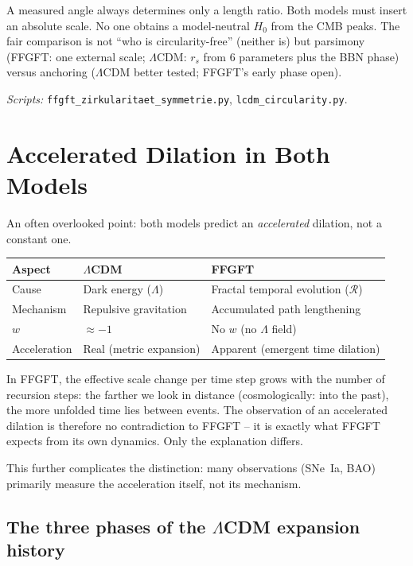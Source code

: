 A measured angle always determines only a length ratio. Both models must
insert an absolute scale. No one obtains a model-neutral $H_0$ from the CMB
peaks. The fair comparison is not ``who is circularity-free'' (neither is)
but parsimony (FFGFT: one external scale; $\Lambda$CDM: $r_s$ from 6
parameters plus the BBN phase) versus anchoring ($\Lambda$CDM better tested;
FFGFT's early phase open).

\emph{Scripts:} \texttt{ffgft\_zirkularitaet\_symmetrie.py},
\texttt{lcdm\_circularity.py}.

\section{Accelerated Dilation in Both Models}

An often overlooked point: both models predict an \emph{accelerated}
dilation, not a constant one.

\begin{center}
\begin{tabular}{p{3cm}p{5cm}p{5cm}}
\toprule
\textbf{Aspect} & \textbf{$\Lambda$CDM} & \textbf{FFGFT} \\
\midrule
Cause & Dark energy ($\Lambda$) & Fractal temporal evolution ($\mathcal{R}$) \\
Mechanism & Repulsive gravitation & Accumulated path lengthening \\
$w$ & $\approx -1$ & No $w$ (no $\Lambda$ field) \\
Acceleration & Real (metric expansion) & Apparent (emergent time dilation) \\
\bottomrule
\end{tabular}
\end{center}

In FFGFT, the effective scale change per time step grows with the number of
recursion steps: the farther we look in distance (cosmologically: into the
past), the more unfolded time lies between events. The observation of an
accelerated dilation is therefore no contradiction to FFGFT -- it is exactly
what FFGFT expects from its own dynamics. Only the explanation differs.

This further complicates the distinction: many observations (SNe~Ia, BAO)
primarily measure the acceleration itself, not its mechanism.

\subsection*{The three phases of the $\Lambda$CDM expansion history}


